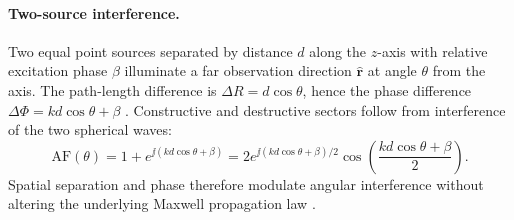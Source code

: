 

\paragraph{Two-source interference.}
Two equal point sources separated by distance $d$ along the $z$-axis with relative excitation phase $\beta$ illuminate a far observation direction $\hat{\mathbf{r}}$ at angle $\theta$ from the axis. The path-length difference is $\Delta R=d\cos\theta$, hence the phase difference $\Delta\Phi=kd\cos\theta+\beta$ \cite{silver1949,stratton1941}. Constructive and destructive sectors follow from interference of the two spherical waves:
\begin{equation}
\label{eq:ch1.two-element-af}
\mathrm{AF}(\theta)=1+e^{\jj(kd\cos\theta+\beta)}
=2e^{\jj(kd\cos\theta+\beta)/2}\cos\!\left(\frac{kd\cos\theta+\beta}{2}\right).
\end{equation}
Spatial separation and phase therefore modulate angular interference without altering the underlying Maxwell propagation law \cite{stratton1941}.


